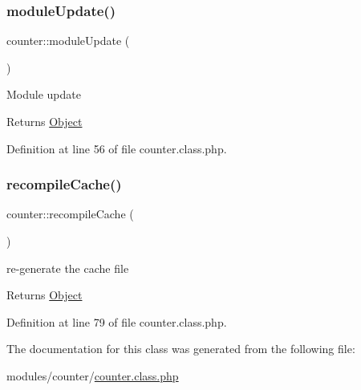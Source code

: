\subsubsection{\texorpdfstring{module\+Update()}{moduleUpdate()}}
{\footnotesize\ttfamily counter\+::module\+Update (\begin{DoxyParamCaption}{ }\end{DoxyParamCaption})}

Module update

\begin{DoxyReturn}{Returns}
\hyperlink{classObject}{Object} 
\end{DoxyReturn}


Definition at line 56 of file counter.\+class.\+php.

\hypertarget{classcounter_a44bf39e02c7cb7c4a3c3000f9b8fba27}{}\label{classcounter_a44bf39e02c7cb7c4a3c3000f9b8fba27} 
\subsubsection{\texorpdfstring{recompile\+Cache()}{recompileCache()}}
{\footnotesize\ttfamily counter\+::recompile\+Cache (\begin{DoxyParamCaption}{ }\end{DoxyParamCaption})}

re-\/generate the cache file

\begin{DoxyReturn}{Returns}
\hyperlink{classObject}{Object} 
\end{DoxyReturn}


Definition at line 79 of file counter.\+class.\+php.



The documentation for this class was generated from the following file\+:\begin{DoxyCompactItemize}
\item 
modules/counter/\hyperlink{counter_8class_8php}{counter.\+class.\+php}\end{DoxyCompactItemize}
